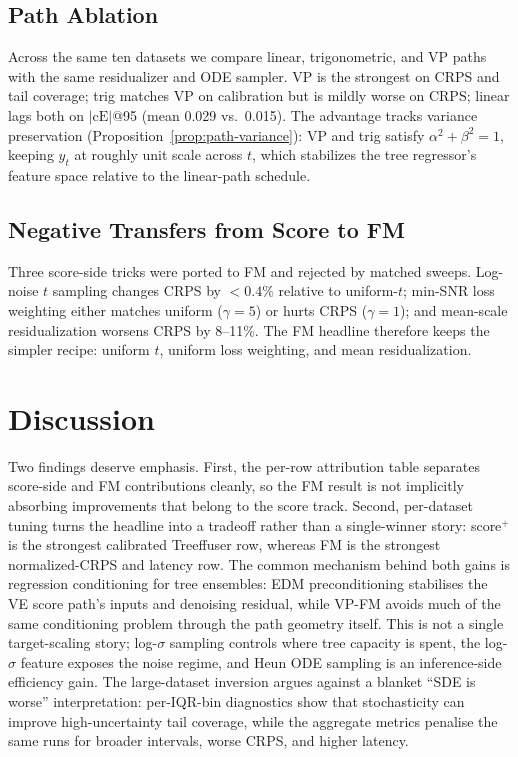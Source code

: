 \documentclass{uai2026}
\begin{document}
\subsection{Path Ablation}\label{sec:abl-path}
Across the same ten datasets we compare linear, trigonometric, and VP paths with the same residualizer and ODE sampler. VP is the strongest on CRPS and tail coverage; trig matches VP on calibration but is mildly worse on CRPS; linear lags both on $|\text{cE}|$@95 (mean 0.029 vs.\ 0.015). The advantage tracks variance preservation (Proposition~\ref{prop:path-variance}): VP and trig satisfy $\alpha^2 + \beta^2 = 1$, keeping $y_t$ at roughly unit scale across $t$, which stabilizes the tree regressor's feature space relative to the linear-path schedule.

\subsection{Negative Transfers from Score to FM}\label{sec:abl-negative}
Three score-side tricks were ported to FM and rejected by matched sweeps. Log-noise $t$ sampling changes CRPS by $<0.4\%$ relative to uniform-$t$; min-SNR loss weighting either matches uniform ($\gamma=5$) or hurts CRPS ($\gamma=1$); and mean-scale residualization worsens CRPS by 8--11\%. The FM headline therefore keeps the simpler recipe: uniform $t$, uniform loss weighting, and mean residualization.

\section{Discussion}\label{sec:disc}
Two findings deserve emphasis. First, the per-row attribution table separates score-side and FM contributions cleanly, so the FM result is not implicitly absorbing improvements that belong to the score track. Second, per-dataset tuning turns the headline into a tradeoff rather than a single-winner story: score$^+$ is the strongest calibrated Treeffuser row, whereas FM is the strongest normalized-CRPS and latency row. The common mechanism behind both gains is regression conditioning for tree ensembles: EDM preconditioning stabilises the VE score path's inputs and denoising residual, while VP-FM avoids much of the same conditioning problem through the path geometry itself. This is not a single target-scaling story; log-$\sigma$ sampling controls where tree capacity is spent, the log-$\sigma$ feature exposes the noise regime, and Heun ODE sampling is an inference-side efficiency gain. The large-dataset inversion argues against a blanket ``SDE is worse'' interpretation: per-IQR-bin diagnostics show that stochasticity can improve high-uncertainty tail coverage, while the aggregate metrics penalise the same runs for broader intervals, worse CRPS, and higher latency.
\end{document}

